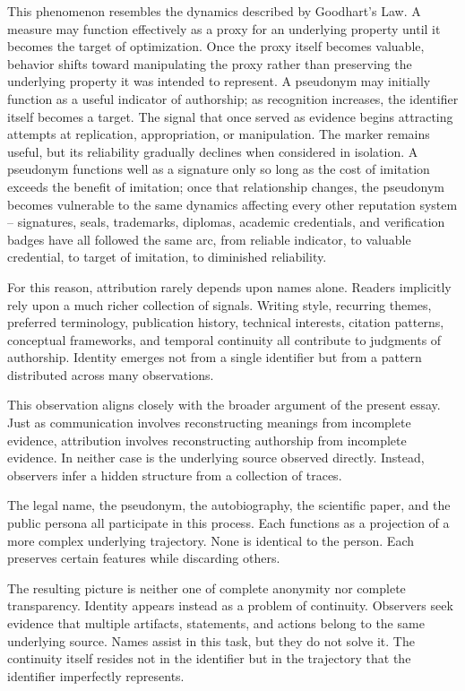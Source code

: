 \documentclass[11pt]{article}
\theoremstyle{plain}
\begin{document}
This phenomenon resembles the dynamics described by Goodhart's Law. A measure may function effectively as a proxy for an underlying property until it becomes the target of optimization. Once the proxy itself becomes valuable, behavior shifts toward manipulating the proxy rather than preserving the underlying property it was intended to represent. A pseudonym may initially function as a useful indicator of authorship; as recognition increases, the identifier itself becomes a target. The signal that once served as evidence begins attracting attempts at replication, appropriation, or manipulation. The marker remains useful, but its reliability gradually declines when considered in isolation. A pseudonym functions well as a signature only so long as the cost of imitation exceeds the benefit of imitation; once that relationship changes, the pseudonym becomes vulnerable to the same dynamics affecting every other reputation system -- signatures, seals, trademarks, diplomas, academic credentials, and verification badges have all followed the same arc, from reliable indicator, to valuable credential, to target of imitation, to diminished reliability.

For this reason, attribution rarely depends upon names alone. Readers implicitly rely upon a much richer collection of signals. Writing style, recurring themes, preferred terminology, publication history, technical interests, citation patterns, conceptual frameworks, and temporal continuity all contribute to judgments of authorship. Identity emerges not from a single identifier but from a pattern distributed across many observations.

This observation aligns closely with the broader argument of the present essay. Just as communication involves reconstructing meanings from incomplete evidence, attribution involves reconstructing authorship from incomplete evidence. In neither case is the underlying source observed directly. Instead, observers infer a hidden structure from a collection of traces.

The legal name, the pseudonym, the autobiography, the scientific paper, and the public persona all participate in this process. Each functions as a projection of a more complex underlying trajectory. None is identical to the person. Each preserves certain features while discarding others.

The resulting picture is neither one of complete anonymity nor complete transparency. Identity appears instead as a problem of continuity. Observers seek evidence that multiple artifacts, statements, and actions belong to the same underlying source. Names assist in this task, but they do not solve it. The continuity itself resides not in the identifier but in the trajectory that the identifier imperfectly represents.
\end{document}
